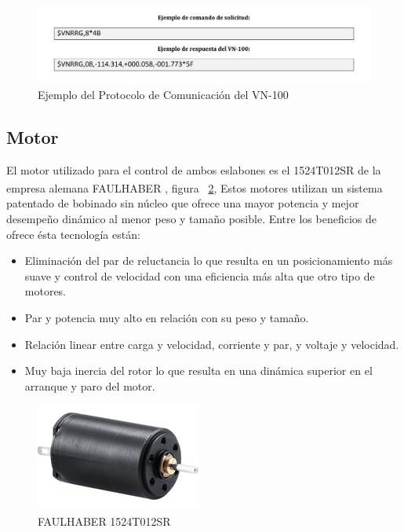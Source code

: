 \begin{figure}[H]
\centering \includegraphics[scale=0.8]{img/VN100Responce.pdf}
\caption{Ejemplo del Protocolo de Comunicaci\'{o}n del VN-100}
\label{fig:VN100Responce}
\end{figure} 

\subsection{Motor}

El motor utilizado para el control de ambos eslabones es el 1524T012SR de la empresa alemana FAULHABER \textsuperscript{\textregistered}, figura ~\ref{fig:motor}, Estos motores utilizan un sistema patentado de bobinado sin n\'{u}cleo que ofrece una mayor potencia y mejor desempe\~{n}o din\'{a}mico al menor peso y tama\~{n}o posible. Entre los beneficios de ofrece \'{e}sta tecnolog\'{i}a est\'{a}n:

\begin{itemize}
    \item Eliminaci\'{o}n del par de reluctancia lo que resulta en un posicionamiento m\'{a}s suave y control de velocidad con una eficiencia m\'{a}s alta que otro tipo de motores.
    \item Par y potencia muy alto en relaci\'{o}n con su peso y tama\~{n}o.
    \item Relaci\'{o}n linear entre carga y velocidad, corriente y par, y voltaje y velocidad.
    \item Muy baja inercia del rotor lo que resulta en una din\'{a}mica superior en el arranque y paro del motor.
\end{itemize}

\begin{figure}[H]
\centering \includegraphics[scale=0.01]{img/motor.png}
\caption{FAULHABER\textsuperscript{\textregistered} 1524T012SR}
\label{fig:motor}
\end{figure} 

